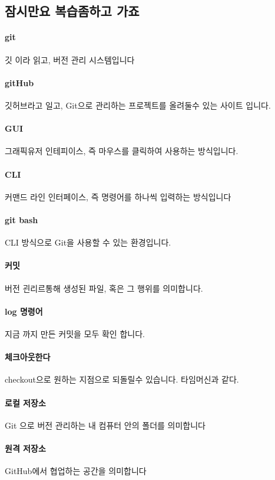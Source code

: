 \documentclass[12pt, a4paper, oneside]{book}
\begin{document}
		\subsection 	{잠시만요 복습좀하고 가죠}

		\paragraph{git} 깃 이라 읽고, 버전 관리 시스템입니다
		\paragraph{gitHub} 깃허브라고 일고, Git으로 관리하는 프로젝트를 올려둘수 있는 사이트 입니다.

		\paragraph{GUI} 그래픽유저 인테피이스, 즉 마우스를 클릭하여 사용하는 방식입니다.
		\paragraph{CLI} 커맨드 라인 인터페이스, 즉 명령어를 하나씩 입력하는 방식입니다

		\paragraph{git bash} CLI 방식으로 Git을 사용할 수 있는 환경입니다.
		\paragraph{커밋} 버전 괸리르통해 생성된 파일, 혹은 그 행위를 의미합니다.
		\paragraph{log 명령어} 지금 까지 만든 커밋을 모두 확인 합니다.
		\paragraph{체크아웃한다} checkout으로 원하는 지점으로 되돌릴수 있습니다.
												타임머신과 같다.
		\paragraph{로컬 저장소} Git 으로 버전 관리하는 내 컴퓨터 안의 폴더를 의미합니다
		\paragraph{원격 저장소} GitHub에서 협업하는 공간을 의미합니다
\end{document}
